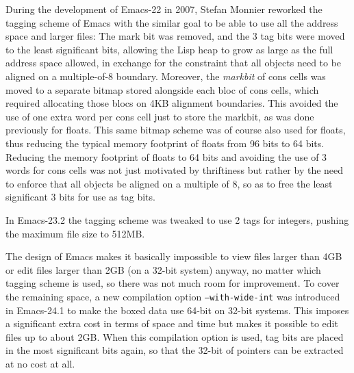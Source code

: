 \documentclass[format=acmsmall, review]{acmart}
\begin{document}
During the development of Emacs-22 in 2007, Stefan Monnier reworked the
tagging scheme of Emacs with the similar goal to be able to use all the
address space and larger files: The mark bit was removed, and the 3 tag bits
were moved to the least significant bits, allowing the Lisp heap to grow as
large as the full address space allowed, in exchange for the constraint that
all objects need to be aligned on a multiple-of-8 boundary.  Moreover, the
\emph{markbit} of cons cells was moved to a separate bitmap stored alongside
each bloc of cons cells, which required allocating those blocs on 4KB
alignment boundaries.  This avoided the use of one extra word per cons cell
just to store the markbit, as was done previously for floats.  This same
bitmap scheme was of course also used for floats, thus reducing the typical
memory footprint of floats from 96 bits to 64 bits.  Reducing the memory
footprint of floats to 64 bits and avoiding the use of 3 words for cons
cells was not just motivated by thriftiness but rather by the need to
enforce that all objects be aligned on a multiple of 8, so as to free the
least significant 3 bits for use as tag bits.

In Emacs-23.2 the tagging scheme was tweaked to use 2 tags for integers,
pushing the maximum file size to 512\;MB.

The design of Emacs makes it basically
impossible to view files larger than 4GB or edit files larger than 2GB (on
a 32-bit system) anyway, no matter which tagging scheme is used, so there was
not much room for improvement.
To cover the remaining space, a new compilation option
\texttt{--with-wide-int} was introduced in Emacs-24.1 to make the boxed data
use 64-bit on 32-bit systems.  This imposes a significant extra cost in terms
of space and time but makes it possible to edit files up to about 2GB.
When this compilation option is used, tag bits are placed in the most
significant bits again, so that the 32-bit of pointers can be extracted at no
cost at all.

\end{document}
